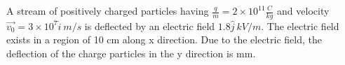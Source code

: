 \item A stream of positively charged particles having $\frac{q}{m} = 2 \times 10^{11} \frac{C}{kg}$ and velocity $\vec{v_0} = 3 \times 10^7 \hat{i} \ m / s$ is deflected by an electric field $1.8 \hat{j} \ kV / m$. The electric field exists in a region of 10 cm along x direction. Due to the electric field, the deflection of the charge particles in the y direction is \underline{\hspace{2.5cm}} mm.